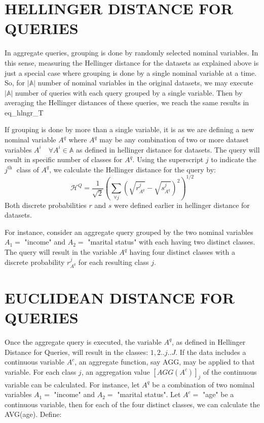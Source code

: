 \documentclass[10pt]{article}
\begin{document}
\section{HELLINGER DISTANCE FOR QUERIES}
In aggregate queries, grouping is done by randomly selected nominal variables. In this sense, measuring the Hellinger distance for the datasets as explained above is just a special case where grouping is done by a single nominal variable at a time. So, for $|\mathbb{A}|$ number of nominal variables in the original datasets, we may execute $|\mathbb{A}|$ number of queries with each query grouped by a single variable. Then by averaging the Hellinger distances of these queries, we reach the same results in eq\_hlngr\_T

If grouping is done by more than a single variable, it is as we are defining a new nominal variable $A^{q}$ where $A^{q}$ may be any combination of two or more dataset variables $A^{i} \quad \forall A^{i} \in \mathbb{A}$ as defined in hellinger distance for datasets. The query will result in specific number of classes for $A^{q}$. Using the superscript $j$ to indicate the $j^{\text {th }}$ class of $A^{q}$, we calculate the Hellinger distance for the query by:
$$
\mathcal{H}^{Q}=\frac{1}{\sqrt{2}}\left(\sum_{\forall j}\left(\sqrt{r_{A^{q}}^{j}}-\sqrt{s_{A^{q}}^{j}}\right)^{2}\right)^{1 / 2}
$$
Both discrete probabilities $r$ and $s$ were defined earlier in hellinger distance for datasets.

For instance, consider an aggregate query grouped by the two nominal variables $A_{1}=$ "income" and $A_{2}=$ "marital status" with each having two distinct classes. The query will result in the variable $A^{q}$ having four distinct classes with a discrete probability $r_{A^{q}}^{j}$ for each resulting class $j$.

\section{EUCLIDEAN DISTANCE FOR QUERIES}
Once the aggregate query is executed, the variable $A^{q}$, as defined in Hellinger Distance for Queries, will result in the classes: $1,2 . . j . . J$. If the data includes a continuous variable $A^{c}$, an aggregate function, say AGG, may be applied to that variable. For each class $j$, an aggregation value $\left[A G G\left(A^{c}\right)\right]_{j}$ of the continuous variable can be calculated. For instance, let $A^{q}$ be a combination of two nominal variables $A_{1}=$ "income" and $A_{2}=$ "marital status". Let $A^{c}=$ "age" be a continuous variable, then for each of the four distinct classes, we can calculate the AVG(age). Define:
\end{document}
